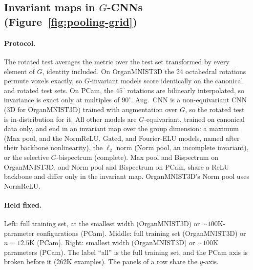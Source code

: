 \documentclass{article}
\theoremstyle{definition}
\theoremstyle{remark}
\theoremstyle{definition}
\begin{document}
\subsection{Invariant maps in $G$-CNNs (Figure~\ref{fig:pooling-grid})}
\label{app:pooling-grid}

\paragraph{Protocol.}
The rotated test averages the metric over the test set transformed by every element of $G$,
identity included. On OrganMNIST3D the 24 octahedral rotations permute voxels exactly, so
$G$-invariant models score identically on the canonical and rotated test sets. On PCam, the
$45^\circ$ rotations are bilinearly interpolated, so invariance is exact only at multiples of
$90^\circ$. Aug.\ CNN is a non-equivariant CNN (3D for OrganMNIST3D) trained with augmentation
over $G$, so the rotated test is in-distribution for it. All other models are $G$-equivariant,
trained on canonical data only, and end in an invariant map over the group dimension: a maximum (Max
pool, and the NormReLU, Gated, and Fourier-ELU models, named after their backbone nonlinearity), the $\ell_2$ norm (Norm
pool, an incomplete invariant), or the selective $G$-bispectrum (complete). Max pool and
Bispectrum on OrganMNIST3D, and Norm pool and Bispectrum on PCam, share a ReLU backbone and differ
only in the invariant map. OrganMNIST3D's Norm pool uses NormReLU.

\paragraph{Held fixed.}
Left: full training set, at the smallest width (OrganMNIST3D) or ${\sim}100$K-parameter
configurations (PCam). Middle: full training set (OrganMNIST3D) or $n = 12.5$K (PCam). Right:
smallest width (OrganMNIST3D) or ${\sim}100$K parameters (PCam). The label ``all'' is the full training set,
and the PCam axis is broken before it (262K examples). The panels of a row share the $y$-axis.
\end{document}
